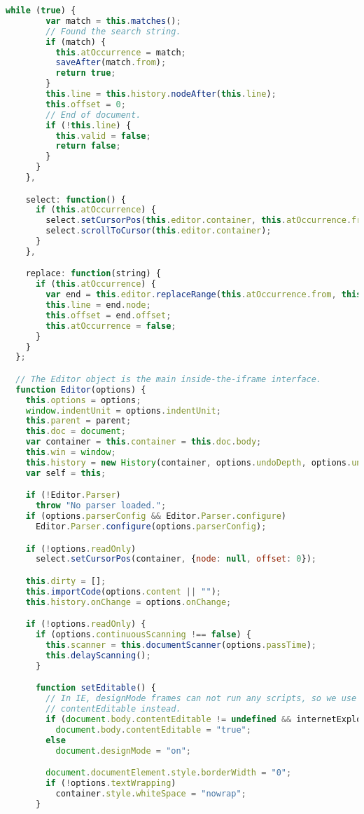 \begin{lstlisting}[language=Javascript]
      while (true) {
        var match = this.matches();
        // Found the search string.
        if (match) {
          this.atOccurrence = match;
          saveAfter(match.from);
          return true;
        }
        this.line = this.history.nodeAfter(this.line);
        this.offset = 0;
        // End of document.
        if (!this.line) {
          this.valid = false;
          return false;
        }
      }
    },

    select: function() {
      if (this.atOccurrence) {
        select.setCursorPos(this.editor.container, this.atOccurrence.from, this.atOccurrence.to);
        select.scrollToCursor(this.editor.container);
      }
    },

    replace: function(string) {
      if (this.atOccurrence) {
        var end = this.editor.replaceRange(this.atOccurrence.from, this.atOccurrence.to, string);
        this.line = end.node;
        this.offset = end.offset;
        this.atOccurrence = false;
      }
    }
  };

  // The Editor object is the main inside-the-iframe interface.
  function Editor(options) {
    this.options = options;
    window.indentUnit = options.indentUnit;
    this.parent = parent;
    this.doc = document;
    var container = this.container = this.doc.body;
    this.win = window;
    this.history = new History(container, options.undoDepth, options.undoDelay, this);
    var self = this;

    if (!Editor.Parser)
      throw "No parser loaded.";
    if (options.parserConfig && Editor.Parser.configure)
      Editor.Parser.configure(options.parserConfig);

    if (!options.readOnly)
      select.setCursorPos(container, {node: null, offset: 0});

    this.dirty = [];
    this.importCode(options.content || "");
    this.history.onChange = options.onChange;

    if (!options.readOnly) {
      if (options.continuousScanning !== false) {
        this.scanner = this.documentScanner(options.passTime);
        this.delayScanning();
      }

      function setEditable() {
        // In IE, designMode frames can not run any scripts, so we use
        // contentEditable instead.
        if (document.body.contentEditable != undefined && internetExplorer)
          document.body.contentEditable = "true";
        else
          document.designMode = "on";

        document.documentElement.style.borderWidth = "0";
        if (!options.textWrapping)
          container.style.whiteSpace = "nowrap";
      }


\end{lstlisting}
